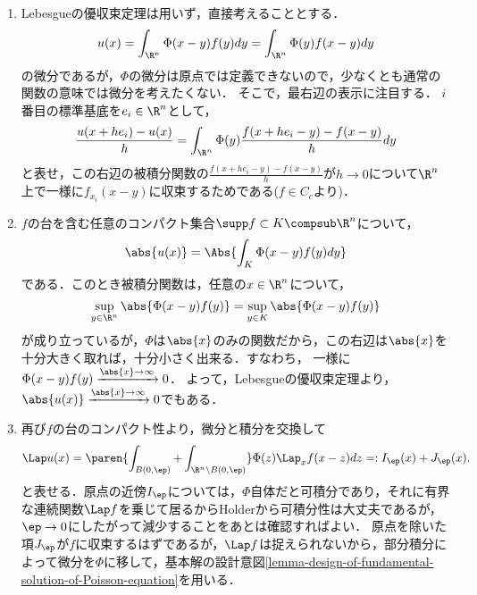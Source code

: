 \documentclass[uplatex,dvipdfmx]{jsreport}
\begin{document}
\begin{Proof}\mbox{}
    \begin{enumerate}
        \item Lebesgueの優収束定理は用いず，直接考えることとする．
        \[u(x)=\int_{\R^n}\Phi(x-y)f(y)dy=\int_{\R^n}\Phi(y)f(x-y)dy\]
        の微分であるが，$\Phi$の微分は原点では定義できないので，少なくとも通常の関数の意味では微分を考えたくない．
        そこで，最右辺の表示に注目する．
        $i$番目の標準基底を$e_i\in\R^n$として，
        \[\frac{u(x+he_i)-u(x)}{h}=\int_{\R^n}\Phi(y)\frac{f(x+he_i-y)-f(x-y)}{h}dy\]
        と表せ，この右辺の被積分関数の$\frac{f(x+he_i-y)-f(x-y)}{h}$が$h\to0$について$\R^n$上で一様に$f_{x_i}(x-y)$に収束するためである($f\in C_c$より)．
        \item $f$の台を含む任意のコンパクト集合$\supp f\subset K\compsub\R^n$について，
        \[\abs{u(x)}=\Abs{\int_K\Phi(x-y)f(y)dy}\]
        である．このとき被積分関数は，任意の$x\in\R^n$について，
        \[\sup_{y\in\R^n}\abs{\Phi(x-y)f(y)}=\sup_{y\in  K}\abs{\Phi(x-y)f(y)}\]
        が成り立っているが，$\Phi$は$\abs{x}$のみの関数だから，この右辺は$\abs{x}$を十分大きく取れば，十分小さく出来る．すなわち，
        一様に$\Phi(x-y)f(y)\xrightarrow{\abs{x}\to\infty}0$．
        よって，Lebesgueの優収束定理より，$\abs{u(x)}\xrightarrow{\abs{x}\to\infty}0$でもある．
        \item 再び$f$の台のコンパクト性より，微分と積分を交換して
        \[\Lap u(x)=\paren{\int_{B(0,\ep)}+\int_{\R^n\setminus B(0,\ep)}}\Phi(z)\Lap_x f(x-z)dz=:I_\ep(x)+J_\ep(x).\]
        と表せる．原点の近傍$I_\ep$については，$\Phi$自体だと可積分であり，それに有界な連続関数$\Lap f$を乗じて居るからHolderから可積分性は大丈夫であるが，$\ep\to0$にしたがって減少することをあとは確認すればよい．
        原点を除いた項$J_\ep$が$f$に収束するはずであるが，$\Lap f$は捉えられないから，部分積分によって微分を$\Phi$に移して，基本解の設計意図\ref{lemma-design-of-fundamental-solution-of-Poisson-equation}を用いる．
        

\end{enumerate}
\end{Proof}
\end{document}
